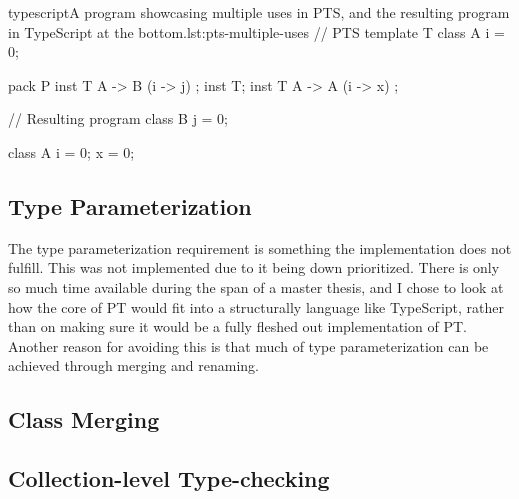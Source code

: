 \begin{code}{typescript}{A program showcasing multiple uses in PTS, and the resulting program in TypeScript at the bottom.}{lst:pts-multiple-uses}
    // PTS
    template T {
        class A {
            i = 0;
        }
    }

    pack P {
        inst T { A -> B (i -> j) };
        inst T;
        inst T { A -> A (i -> x) };
    }

    // Resulting program
    class B {
        j = 0;
    }

    class A {
        i = 0;
        x = 0;
    }
\end{code}

\subsection{Type Parameterization}

The type parameterization requirement is something the implementation does not fulfill.
This was not implemented due to it being down prioritized.
There is only so much time available during the span of a master thesis, and I chose to look at how the core of PT would fit into a structurally language like TypeScript, rather than on making sure it would be a fully fleshed out implementation of PT\@.
Another reason for avoiding this is that much of type parameterization can be achieved through merging and renaming.


\subsection{Class Merging}

\subsection{Collection-level Type-checking}\label{subsec:implementation-collection-level-type-checking}


